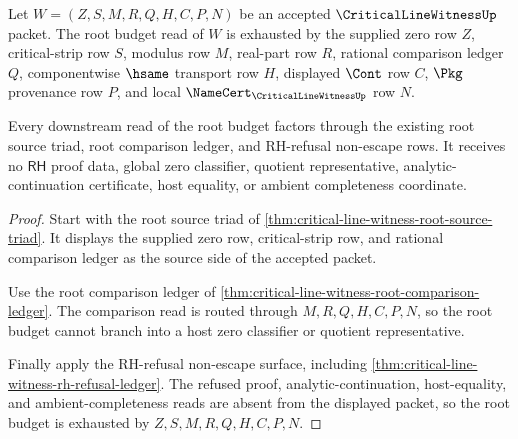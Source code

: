 \begin{theorem}
\label{thm:critical-line-witness-root-budget-obligation}
Let $W=(Z,S,M,R,Q,H,C,P,N)$ be an accepted $\CriticalLineWitnessUp$ packet. The root budget read of $W$ is exhausted by the supplied zero row $Z$, critical-strip row $S$, modulus row $M$, real-part row $R$, rational comparison ledger $Q$, componentwise $\hsame$ transport row $H$, displayed $\Cont$ row $C$, $\Pkg$ provenance row $P$, and local $\NameCert_{\CriticalLineWitnessUp}$ row $N$.

Every downstream read of the root budget factors through the existing root source triad, root comparison ledger, and RH-refusal non-escape rows. It receives no $\mathsf{RH}$ proof data, global zero classifier, quotient representative, analytic-continuation certificate, host equality, or ambient completeness coordinate.
\end{theorem}
\begin{proof}
Start with the root source triad of \autoref{thm:critical-line-witness-root-source-triad}. It displays the supplied zero row, critical-strip row, and rational comparison ledger as the source side of the accepted packet.

Use the root comparison ledger of \autoref{thm:critical-line-witness-root-comparison-ledger}. The comparison read is routed through $M,R,Q,H,C,P,N$, so the root budget cannot branch into a host zero classifier or quotient representative.

Finally apply the RH-refusal non-escape surface, including \autoref{thm:critical-line-witness-rh-refusal-ledger}. The refused proof, analytic-continuation, host-equality, and ambient-completeness reads are absent from the displayed packet, so the root budget is exhausted by $Z,S,M,R,Q,H,C,P,N$.
\end{proof}

